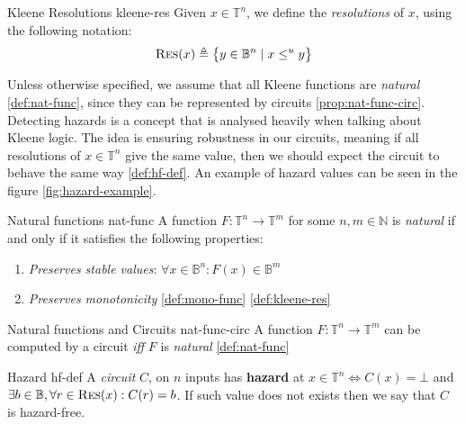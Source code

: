 \begin{definitionbox}{Kleene Resolutions \cite{mukaidono_BternaryLogicFunction_1972, ikenmeyer_ComplexityHazardfreeCircuits_2019}}{kleene-res}
    Given $x \in \mathbb{T}^n$, we define the \textit{resolutions} of $x$, using the following notation:
    $$
        \textnormal{\textsc{Res}}(x) \triangleq \big\{ y \in \mathbb{B}^n \mid x \leq^u y  \big\}
    $$
\end{definitionbox}

Unless otherwise specified, we assume that all Kleene functions are \textit{natural} \ref{def:nat-func}, since
they can be represented by circuits \ref{prop:nat-func-circ}.
Detecting hazards is a concept that is analysed heavily when talking about Kleene logic.
The idea is ensuring robustness in our circuits, meaning if all resolutions of $x \in \mathbb{T}^n$
give the same value, then we should expect the circuit to behave the same way \ref{def:hf-def}.
An example of hazard values can be seen in the figure \ref{fig:hazard-example}.


\begin{definitionbox}{Natural functions \cite{ikenmeyer_ComplexityHazardfreeCircuits_2019}}{nat-func}
    A function $F: \mathbb{T}^n \to \mathbb{T}^m$ for some $n, m \in \mathbb{N}$ is \textit{natural} if and only
    if it satisfies the following properties:
    \begin{enumerate}
        \item \textit{Preserves stable values}: $\forall x \in \mathbb{B}^n: F(x) \in \mathbb{B}^m$
        \item \textit{Preserves monotonicity} \ref{def:mono-func} \ref{def:kleene-res}
    \end{enumerate}
\end{definitionbox}

\begin{propositionbox}{Natural functions and Circuits \cite{mukaidono_BternaryLogicFunction_1972,ikenmeyer_ComplexityHazardfreeCircuits_2019}}{nat-func-circ}
    A function $F: \mathbb{T}^n \to \mathbb{T}^m$ can be computed by a circuit \textit{iff} $F$ is \textit{natural} \ref{def:nat-func}
\end{propositionbox}

\begin{definitionbox}{Hazard \cite{ikenmeyer_ComplexityHazardfreeCircuits_2019, eichelberger_HazardDetectionCombinational_1965}}{hf-def}
    A \textit{circuit} $C$, on $n$ inputs has \textbf{hazard} at $x \in \mathbb{T}^n \iff C(x) = \bot$
    and $\exists b \in \mathbb{B}, \forall r \in \textnormal{\textsc{Res}}(x): C(r) = b$. If such value does not exists
    then we say that $C$ is hazard-free.
\end{definitionbox}

